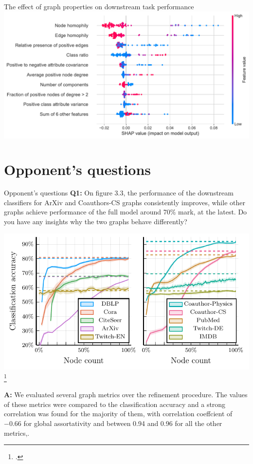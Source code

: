 \documentclass[10pt]{beamer}
\begin{document}
\begin{frame}{The effect of graph properties on downstream task performance}
	\includegraphics[width=\linewidth]{images/graph-property-importance.pdf}
\end{frame}

\begin{frame}
	\titlepage
\end{frame}

\section{Opponent's questions}

\begin{frame}{Opponent's questions}
	\textbf{Q1:} On figure 3.3, the performance of the downstream classifiers for ArXiv and Coauthors-CS graphs consistently improves, while other graphs achieve performance of the full model around 70\% mark, at the latest. Do you have any insights why the two graphs behave differently?
	\begin{center}
		\includegraphics[width=0.5\pagewidth]{images/adaptive-coarsening/adaptive-coarsening.pdf}\footcite{dedic_balancing_2024}
	\end{center}

	\textbf{A:} We evaluated several graph metrics over the refinement procedure. The values of these metrics were compared to the classification accuracy and a strong correlation was found for the majority of them, with correlation coeffcient of −0.66 for global assortativity and between 0.94 and 0.96 for all the other metrics,.
\end{frame}
\end{document}
